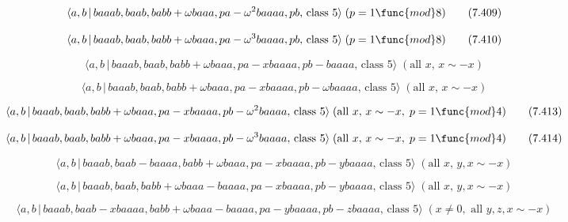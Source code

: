 \documentclass[10pt]{article}
\begin{document}
\begin{equation}
\langle a,b\,|\,baaab,baab,babb+\omega baaa,pa-\omega ^{2}baaaa,pb,\,\text{%
class }5\rangle \;(p=1\func{mod}8)  \tag{7.409}
\end{equation}

\begin{equation}
\langle a,b\,|\,baaab,baab,babb+\omega baaa,pa-\omega ^{3}baaaa,pb,\,\text{%
class }5\rangle \;(p=1\func{mod}8)  \tag{7.410}
\end{equation}

\begin{equation}
\langle a,b\,|\,baaab,baab,babb+\omega baaa,pa-xbaaaa,pb-baaaa,\,\text{class 
}5\rangle \;(\text{all }x,\,x\sim -x)  \tag{7.411}
\end{equation}

\begin{equation}
\langle a,b\,|\,baaab,baab,babb+\omega baaa,pa-xbaaaa,pb-\omega baaaa,\,%
\text{class }5\rangle \;(\text{all }x,\,x\sim -x)  \tag{7.412}
\end{equation}

\begin{equation}
\langle a,b\,|\,baaab,baab,babb+\omega baaa,pa-xbaaaa,pb-\omega ^{2}baaaa,\,%
\text{class }5\rangle \;(\text{all }x,\,x\sim -x,\;p=1\func{mod}4) 
\tag{7.413}
\end{equation}

\begin{equation}
\langle a,b\,|\,baaab,baab,babb+\omega baaa,pa-xbaaaa,pb-\omega ^{3}baaaa,\,%
\text{class }5\rangle \;(\text{all }x,\,x\sim -x,\;p=1\func{mod}4) 
\tag{7.414}
\end{equation}

\begin{equation}
\langle a,b\,|\,baaab,baab-baaaa,babb+\omega baaa,pa-xbaaaa,pb-ybaaaa,\,%
\text{class }5\rangle \;(\text{all }x,\,y,x\sim -x)  \tag{7.415}
\end{equation}

\begin{equation}
\langle a,b\,|\,baaab,baab,babb+\omega baaa-baaaa,pa-xbaaaa,pb-ybaaaa,\,%
\text{class }5\rangle \;(\text{all }x,\,y,x\sim -x)  \tag{7.416}
\end{equation}

\begin{equation}
\langle a,b\,|\,baaab,baab-xbaaaa,babb+\omega
baaa-baaaa,pa-ybaaaa,pb-zbaaaa,\,\text{class }5\rangle \;(x\neq 0,\text{ all 
}y,z,x\sim -x)  \tag{7.417}
\end{equation}
\end{document}
